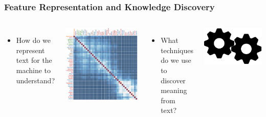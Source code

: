 \documentclass[10pt,xcolor=table]{beamer}
\begin{document}
	
\begin{frame}
\frametitle{Feature Representation and Knowledge Discovery}


\begin{columns}
\begin{itemize}
\item[] How do we represent text for the machine to understand? 
\end{itemize}
\begin{minipage}[c][0.5\textheight][c]{\linewidth}
\centering
\includegraphics[width=.7\linewidth]{image2/Chapitre1/matrix.png}
\end{minipage}
\begin{itemize}
\item[] What techniques do we use to discover meaning from text?
\end{itemize}
\begin{minipage}[c][0.5\textheight][c]{\linewidth}
\centering
\includegraphics[width=.8\linewidth]{image2/Chapitre1/kdisc.png}
\end{minipage}
\end{columns}

\vspace{\textheight}

\end{frame}
\end{document}
